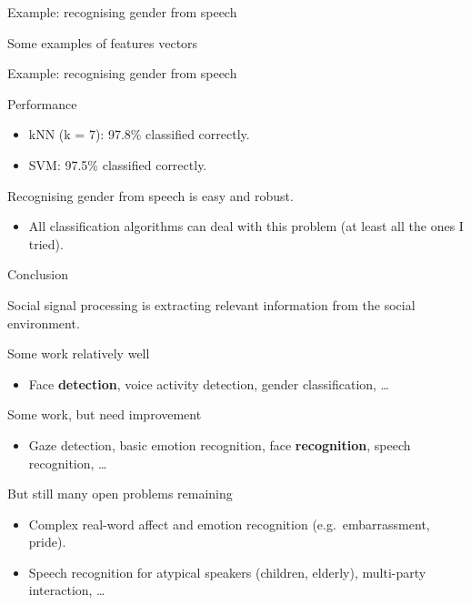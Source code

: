 \documentclass[compress]{beamer}
\begin{document}
\begin{frame}{Example: recognising gender from speech}

\begin{block}{Some examples of features vectors}

\end{block}

\end{frame}

\begin{frame}{Example: recognising gender from speech}

Performance

\begin{itemize}

\item kNN (k = 7): 97.8\% classified correctly.
\item SVM: 97.5\% classified correctly.
\end{itemize}

Recognising gender from speech is easy and robust.

\begin{itemize}

\item All classification algorithms can deal with this problem (at least all
  the ones I tried).
\end{itemize}

\end{frame}

\begin{frame}{Conclusion}

Social signal processing is extracting relevant information from the
social environment.

Some work relatively well

\begin{itemize}

\item Face \textbf{detection}, voice activity detection, gender
  classification, \ldots{}
\end{itemize}

Some work, but need improvement

\begin{itemize}

\item Gaze detection, basic emotion recognition, face \textbf{recognition},
  speech recognition, \ldots{}
\end{itemize}

But still many open problems remaining

\begin{itemize}

\item Complex real-word affect and emotion recognition (e.g.~embarrassment,
  pride).
\item Speech recognition for atypical speakers (children, elderly),
  multi-party interaction, \ldots{}
\end{itemize}

\end{frame}
\end{document}
